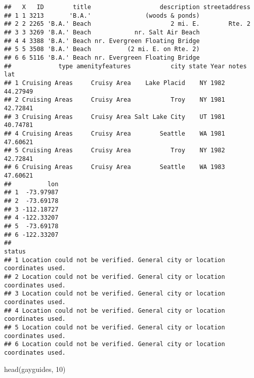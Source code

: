 \documentclass[
]{article}
\newenvironment{Shaded}{\begin{snugshade}}{\end{snugshade}}
\newcommand{\DecValTok}[1]{\textcolor[rgb]{0.00,0.00,0.81}{#1}}
\newcommand{\FunctionTok}[1]{\textcolor[rgb]{0.00,0.00,0.00}{#1}}
\newcommand{\NormalTok}[1]{#1}
\begin{document}
\begin{verbatim}
##   X   ID        title                   description streetaddress
## 1 1 3213       'B.A.'               (woods & ponds)              
## 2 2 2265 'B.A.' Beach                      2 mi. E.        Rte. 2
## 3 3 3269 'B.A.' Beach            nr. Salt Air Beach              
## 4 4 3388 'B.A.' Beach nr. Evergreen Floating Bridge              
## 5 5 3508 'B.A.' Beach          (2 mi. E. on Rte. 2)              
## 6 6 5116 'B.A.' Beach nr. Evergreen Floating Bridge              
##             type amenityfeatures           city state Year notes      lat
## 1 Cruising Areas     Cruisy Area    Lake Placid    NY 1982       44.27949
## 2 Cruising Areas     Cruisy Area           Troy    NY 1981       42.72841
## 3 Cruising Areas     Cruisy Area Salt Lake City    UT 1981       40.74781
## 4 Cruising Areas     Cruisy Area        Seattle    WA 1981       47.60621
## 5 Cruising Areas     Cruisy Area           Troy    NY 1982       42.72841
## 6 Cruising Areas     Cruisy Area        Seattle    WA 1983       47.60621
##          lon
## 1  -73.97987
## 2  -73.69178
## 3 -112.18727
## 4 -122.33207
## 5  -73.69178
## 6 -122.33207
##                                                                       status
## 1 Location could not be verified. General city or location coordinates used.
## 2 Location could not be verified. General city or location coordinates used.
## 3 Location could not be verified. General city or location coordinates used.
## 4 Location could not be verified. General city or location coordinates used.
## 5 Location could not be verified. General city or location coordinates used.
## 6 Location could not be verified. General city or location coordinates used.
\end{verbatim}

\begin{Shaded}
\begin{Highlighting}[]
\FunctionTok{head}\NormalTok{(gayguides, }\DecValTok{10}\NormalTok{)}
\end{Highlighting}
\end{Shaded}
\end{document}
